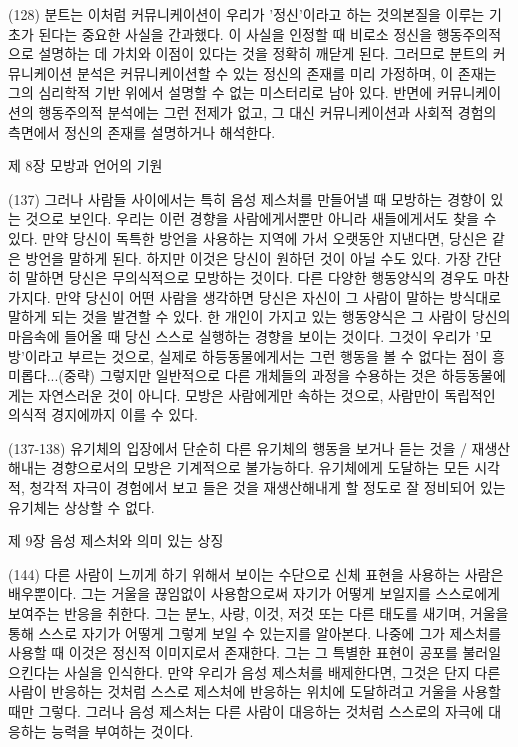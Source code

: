 \documentclass[11pt, a4paper]{article}
\begin{document}
(128) 분트는 이처럼 커뮤니케이션이 우리가 '정신'이라고 하는 것의본질을 이루는 기초가 된다는 중요한 사실을 간과했다. 이 사실을 인정할 때 비로소 정신을 행동주의적으로 설명하는 데 가치와 이점이 있다는 것을 정확히 깨닫게 된다. 그러므로 분트의 커뮤니케이션 분석은 커뮤니케이션할 수 있는 정신의 존재를 미리 가정하며, 이 존재는 그의 심리학적 기반 위에서 설명할 수 없는 미스터리로 남아 있다. 반면에 커뮤니케이션의 행동주의적 분석에는 그런 전제가 없고, 그 대신 커뮤니케이션과 사회적 경험의 측면에서 정신의 존재를 설명하거나 해석한다.

제 8장 모방과 언어의 기원

(137) 그러나 사람들 사이에서는 특히 음성 제스처를 만들어낼 때 모방하는 경향이 있는 것으로 보인다. 우리는 이런 경향을 사람에게서뿐만 아니라 새들에게서도 찾을 수 있다. 만약 당신이 독특한 방언을 사용하는 지역에 가서 오랫동안 지낸다면, 당신은 같은 방언을 말하게 된다. 하지만 이것은 당신이 원하던 것이 아닐 수도 있다. 가장 간단히 말하면 당신은 무의식적으로 모방하는 것이다. 다른 다양한 행동양식의 경우도 마찬가지다. 만약 당신이 어떤 사람을 생각하면 당신은 자신이 그 사람이 말하는 방식대로 말하게 되는 것을 발견할 수 있다. 한 개인이 가지고 있는 행동양식은 그 사람이 당신의 마음속에 들어올 때 당신 스스로 실행하는 경향을 보이는 것이다. 그것이 우리가 '모방'이라고 부르는 것으로, 실제로 하등동물에게서는 그런 행동을 볼 수 없다는 점이 흥미롭다...(중략) 그렇지만 일반적으로 다른 개체들의 과정을 수용하는 것은 하등동물에게는 자연스러운 것이 아니다. 모방은 사람에게만 속하는 것으로, 사람만이 독립적인 의식적 경지에까지 이를 수 있다.

(137-138) 유기체의 입장에서 단순히 다른 유기체의 행동을 보거나 듣는 것을 / 재생산해내는 경향으로서의 모방은 기계적으로 불가능하다. 유기체에게 도달하는 모든 시각적, 청각적 자극이 경험에서 보고 들은 것을 재생산해내게 할 정도로 잘 정비되어 있는 유기체는 상상할 수 없다.

제 9장 음성 제스처와 의미 있는 상징

(144) 다른 사람이 느끼게 하기 위해서 보이는 수단으로 신체 표현을 사용하는 사람은 배우뿐이다. 그는 거울을 끊임없이 사용함으로써 자기가 어떻게 보일지를 스스로에게 보여주는 반응을 취한다. 그는 분노, 사랑, 이것, 저것 또는 다른 태도를 새기며, 거울을 통해 스스로 자기가 어떻게 그렇게 보일 수 있는지를 알아본다. 나중에 그가 제스처를 사용할 때 이것은 정신적 이미지로서 존재한다. 그는 그 특별한 표현이 공포를 불러일으킨다는 사실을 인식한다. 만약 우리가 음성 제스처를 배제한다면, 그것은 단지 다른 사람이 반응하는 것처럼 스스로 제스처에 반응하는 위치에 도달하려고 거울을 사용할 때만 그렇다. 그러나 음성 제스처는 다른 사람이 대응하는 것처럼 스스로의 자극에 대응하는 능력을 부여하는 것이다. 
\end{document}
